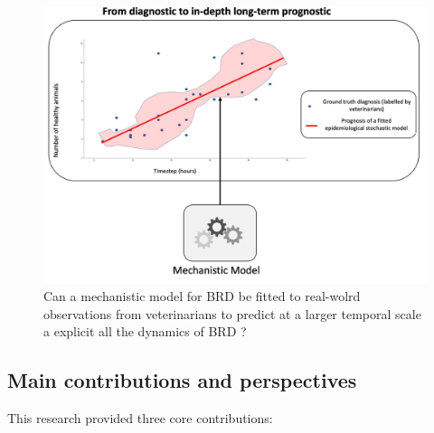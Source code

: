 \begin{figure}
  \includegraphics[width=\linewidth]{figures/chap2/chap1-question2.jpg}
  \caption{Can a mechanistic model for BRD be fitted to real-wolrd observations from veterinarians to predict at a larger temporal scale a explicit all the dynamics of BRD ?}
  \label{fig:chap2-question2}
\end{figure}
\newpage    


\subsection{Main contributions and perspectives}
\label{chap:contributions}
This research provided three core contributions:

